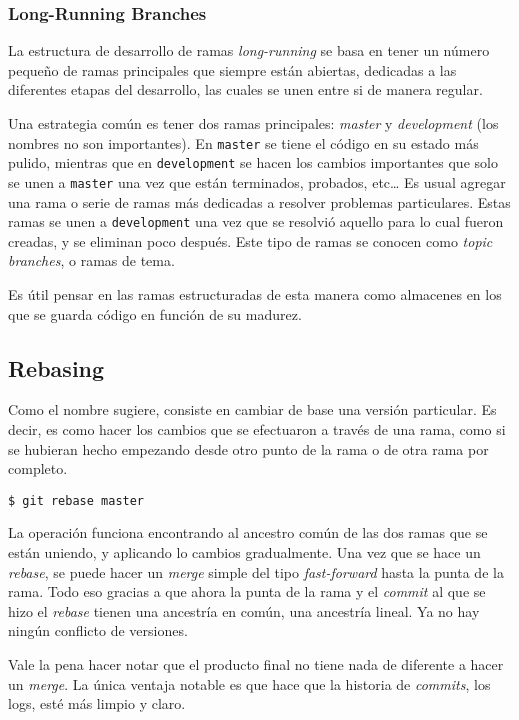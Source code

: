 \documentclass[spanish, 12pt, a4paper]{article}
\begin{document}
\subsubsection{Long-Running Branches}
La estructura de desarrollo de ramas \textit{long-running} se basa en tener un
número pequeño de ramas principales que siempre están abiertas, dedicadas a las
diferentes etapas del desarrollo, las cuales se unen entre si de manera regular.

Una estrategia común es tener dos ramas principales: \textit{master} y
\textit{development} (los nombres no son importantes).
En \texttt{master} se tiene el código en su estado más pulido, mientras que en
\texttt{development} se hacen los cambios importantes que solo se unen a
\texttt{master} una vez que están terminados, probados, etc\dots
Es usual agregar una rama o serie de ramas más dedicadas a resolver problemas
particulares.
Estas ramas se unen a \texttt{development} una vez que se resolvió aquello para
lo cual fueron creadas, y se eliminan poco después.
Este tipo de ramas se conocen como \textit{topic branches}, o ramas de tema.

Es útil pensar en las ramas estructuradas de esta manera como almacenes en los
que se guarda código en función de su madurez.


\subsection{Rebasing}
Como el nombre sugiere, consiste en cambiar de base una versión particular.
Es decir, es como hacer los cambios que se efectuaron a través de una rama, como
si se hubieran hecho empezando desde otro punto de la rama o de otra rama por
completo.
\begin{lstlisting}
$ git rebase master
\end{lstlisting}

La operación funciona encontrando al ancestro común de las dos ramas que se
están uniendo, y aplicando lo cambios gradualmente.
Una vez que se hace un \textit{rebase}, se puede hacer un \textit{merge} simple
del tipo \textit{fast-forward} hasta la punta de la rama.
Todo eso gracias a que ahora la punta de la rama y el \textit{commit} al que se
hizo el \textit{rebase} tienen una ancestría en común, una ancestría lineal.
Ya no hay ningún conflicto de versiones.

Vale la pena hacer notar que el producto final no tiene nada de diferente a
hacer un \textit{merge}.
La única ventaja notable es que hace que la historia de \textit{commits}, los
logs, esté más limpio y claro.
\end{document}
